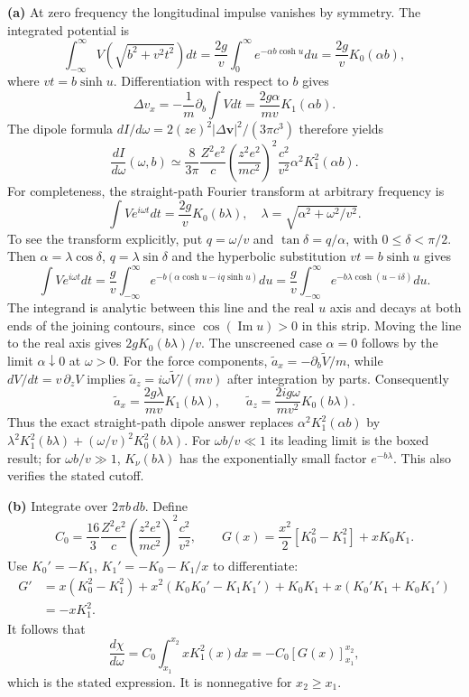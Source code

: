 \medskip\noindent\textbf{(a)} At zero frequency the longitudinal
impulse vanishes by symmetry.  The integrated potential is
\[
\int_{-\infty}^{\infty}V(\sqrt{b^2+v^2t^2})dt
=\frac{2g}{v}\int_0^\infty e^{-\alpha b\cosh u}du
=\frac{2g}{v}K_0(\alpha b),
\]
where $vt=b\sinh u$.  Differentiation with respect to $b$ gives
\[
\Delta v_x=-\frac1m\partial_b\int Vdt
=\frac{2g\alpha}{mv}K_1(\alpha b).
\]
The dipole formula $dI/d\omega=2(ze)^2|\Delta\mathbf v|^2/(3\pi c^3)$
therefore yields
\[
\boxed{\frac{dI}{d\omega}(\omega,b)\simeq
\frac8{3\pi}\frac{Z^2e^2}{c}
 \left(\frac{z^2e^2}{mc^2}\right)^2\frac{c^2}{v^2}
 \alpha^2K_1^2(\alpha b).}
\]
For completeness, the straight-path Fourier transform at arbitrary
frequency is
\[
\int V e^{i\omega t}dt=\frac{2g}{v}K_0(b\lambda),
\quad \lambda=\sqrt{\alpha^2+\omega^2/v^2}.
\]
To see the transform explicitly, put $q=\omega/v$ and
$\tan\delta=q/\alpha$, with $0\leq\delta<\pi/2$.  Then
$\alpha=\lambda\cos\delta$, $q=\lambda\sin\delta$ and the
hyperbolic substitution $vt=b\sinh u$ gives
\[
\int V e^{i\omega t}dt
=\frac gv\int_{-\infty}^{\infty}
 e^{-b(\alpha\cosh u-iq\sinh u)}du
=\frac gv\int_{-\infty}^{\infty}
 e^{-b\lambda\cosh(u-i\delta)}du.
\]
The integrand is analytic between this line and the real $u$ axis
and decays at both ends of the joining contours, since
$\cos(\operatorname{Im}u)>0$ in this strip.  Moving the line to
the real axis gives $2gK_0(b\lambda)/v$.  The unscreened case
$\alpha=0$ follows by the limit $\alpha\downarrow0$ at $\omega>0$.
For the force components, $\widetilde a_x=-\partial_b\widetilde V/m$,
while $dV/dt=v\,\partial_zV$ implies
$\widetilde a_z=i\omega\widetilde V/(mv)$ after integration by parts.
Consequently
\[
\widetilde a_x=\frac{2g\lambda}{mv}K_1(b\lambda),\qquad
\widetilde a_z=\frac{2ig\omega}{mv^2}K_0(b\lambda).
\]
Thus the exact straight-path dipole answer replaces
$\alpha^2K_1^2(\alpha b)$ by
$\lambda^2K_1^2(b\lambda)+(\omega/v)^2K_0^2(b\lambda)$.
For $\omega b/v\ll1$ its leading limit is the boxed result;
for $\omega b/v\gg1$, $K_\nu(b\lambda)$ has the exponentially
small factor $e^{-b\lambda}$.  This also verifies the stated cutoff.

\medskip\noindent\textbf{(b)} Integrate over $2\pi b\,db$.
Define
\[
C_0=\frac{16}3\frac{Z^2e^2}{c}
 \left(\frac{z^2e^2}{mc^2}\right)^2\frac{c^2}{v^2},\qquad
G(x)=\frac{x^2}{2}[K_0^2-K_1^2]+
 xK_0K_1.
\]
Use $K_0'=-K_1$, $K_1'=-K_0-K_1/x$ to differentiate:
\begin{align*}
G'&=x(K_0^2-K_1^2)+x^2(K_0K_0'-K_1K_1')
 +K_0K_1+x(K_0'K_1+K_0K_1')\\
&=-xK_1^2.
\end{align*}
It follows that
\[
\boxed{\frac{d\chi}{d\omega}=C_0\int_{x_1}^{x_2}xK_1^2(x)dx
=-C_0[G(x)]_{x_1}^{x_2},}
\]
which is the stated expression.  It is nonnegative for $x_2\geq x_1$.

